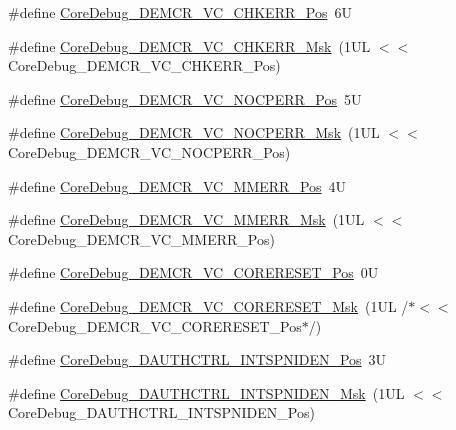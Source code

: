 \begin{DoxyCompactItemize}
\item 
\#define \mbox{\hyperlink{group___c_m_s_i_s___core_debug_ga10fc7c53bca904c128bc8e1a03072d50}{Core\+Debug\+\_\+\+D\+E\+M\+C\+R\+\_\+\+V\+C\+\_\+\+C\+H\+K\+E\+R\+R\+\_\+\+Pos}}~6U
\item 
\#define \mbox{\hyperlink{group___c_m_s_i_s___core_debug_ga2f98b461d19746ab2febfddebb73da6f}{Core\+Debug\+\_\+\+D\+E\+M\+C\+R\+\_\+\+V\+C\+\_\+\+C\+H\+K\+E\+R\+R\+\_\+\+Msk}}~(1\+U\+L $<$$<$ Core\+Debug\+\_\+\+D\+E\+M\+C\+R\+\_\+\+V\+C\+\_\+\+C\+H\+K\+E\+R\+R\+\_\+\+Pos)
\item 
\#define \mbox{\hyperlink{group___c_m_s_i_s___core_debug_gac9d13eb2add61f610d5ced1f7ad2adf8}{Core\+Debug\+\_\+\+D\+E\+M\+C\+R\+\_\+\+V\+C\+\_\+\+N\+O\+C\+P\+E\+R\+R\+\_\+\+Pos}}~5U
\item 
\#define \mbox{\hyperlink{group___c_m_s_i_s___core_debug_ga03ee58b1b02fdbf21612809034562f1c}{Core\+Debug\+\_\+\+D\+E\+M\+C\+R\+\_\+\+V\+C\+\_\+\+N\+O\+C\+P\+E\+R\+R\+\_\+\+Msk}}~(1\+U\+L $<$$<$ Core\+Debug\+\_\+\+D\+E\+M\+C\+R\+\_\+\+V\+C\+\_\+\+N\+O\+C\+P\+E\+R\+R\+\_\+\+Pos)
\item 
\#define \mbox{\hyperlink{group___c_m_s_i_s___core_debug_ga444454f7c7748e76cd76c3809c887c41}{Core\+Debug\+\_\+\+D\+E\+M\+C\+R\+\_\+\+V\+C\+\_\+\+M\+M\+E\+R\+R\+\_\+\+Pos}}~4U
\item 
\#define \mbox{\hyperlink{group___c_m_s_i_s___core_debug_gad420a9b60620584faaca6289e83d3a87}{Core\+Debug\+\_\+\+D\+E\+M\+C\+R\+\_\+\+V\+C\+\_\+\+M\+M\+E\+R\+R\+\_\+\+Msk}}~(1\+U\+L $<$$<$ Core\+Debug\+\_\+\+D\+E\+M\+C\+R\+\_\+\+V\+C\+\_\+\+M\+M\+E\+R\+R\+\_\+\+Pos)
\item 
\#define \mbox{\hyperlink{group___c_m_s_i_s___core_debug_ga9fcf09666f7063a7303117aa32a85d5a}{Core\+Debug\+\_\+\+D\+E\+M\+C\+R\+\_\+\+V\+C\+\_\+\+C\+O\+R\+E\+R\+E\+S\+E\+T\+\_\+\+Pos}}~0U
\item 
\#define \mbox{\hyperlink{group___c_m_s_i_s___core_debug_ga906476e53c1e1487c30f3a1181df9e30}{Core\+Debug\+\_\+\+D\+E\+M\+C\+R\+\_\+\+V\+C\+\_\+\+C\+O\+R\+E\+R\+E\+S\+E\+T\+\_\+\+Msk}}~(1\+U\+L /$\ast$$<$$<$ Core\+Debug\+\_\+\+D\+E\+M\+C\+R\+\_\+\+V\+C\+\_\+\+C\+O\+R\+E\+R\+E\+S\+E\+T\+\_\+\+Pos$\ast$/)
\item 
\#define \mbox{\hyperlink{group___c_m_s_i_s___core_debug_gaf733a36e6b4717a604f7d77c05dfceb4}{Core\+Debug\+\_\+\+D\+A\+U\+T\+H\+C\+T\+R\+L\+\_\+\+I\+N\+T\+S\+P\+N\+I\+D\+E\+N\+\_\+\+Pos}}~3U
\item 
\#define \mbox{\hyperlink{group___c_m_s_i_s___core_debug_gadad0bf68d32cba49c1ea7534122c2752}{Core\+Debug\+\_\+\+D\+A\+U\+T\+H\+C\+T\+R\+L\+\_\+\+I\+N\+T\+S\+P\+N\+I\+D\+E\+N\+\_\+\+Msk}}~(1\+U\+L $<$$<$ Core\+Debug\+\_\+\+D\+A\+U\+T\+H\+C\+T\+R\+L\+\_\+\+I\+N\+T\+S\+P\+N\+I\+D\+E\+N\+\_\+\+Pos)

\end{DoxyCompactItemize}
